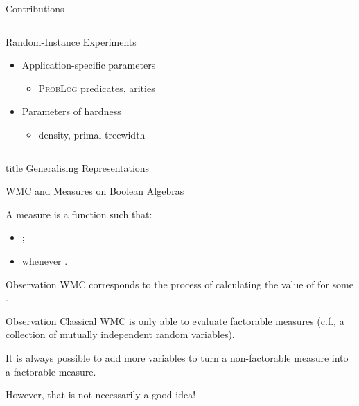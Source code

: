 \documentclass{beamer}
\begin{document}
\begin{frame}{Contributions}
\begin{columns}[t]
\begin{column}{0.54\textwidth}
      \begin{block}{Random-Instance Experiments}
        \begin{itemize}
          \item Application-specific parameters%
          \begin{itemize}
            \item \textsc{ProbLog} predicates, arities
          \end{itemize}
          \item Parameters of hardness
          \begin{itemize}
            \item density, primal treewidth
          \end{itemize}
        \end{itemize}
      \end{block}
    \end{column}
  \end{columns}
\end{frame}

\begin{frame}
  \vfill
  \centering
  \begin{beamercolorbox}[sep=8pt,center,shadow=true,rounded=true]{title}
    Generalising Representations\par%
  \end{beamercolorbox}
  \vfill
\end{frame}

\begin{frame}{WMC and Measures on Boolean Algebras}
  \begin{definition}
    A \alert{measure} is a function
    such that:
    \begin{itemize}
      \item {};
      \item {} whenever
            .
    \end{itemize}
  \end{definition}
  \begin{block}{Observation}
    WMC corresponds to the process of calculating the value of
     for some
    .
  \end{block}
  \pause
  \begin{block}{Observation}
    Classical WMC is only able to evaluate \alert{factorable} measures (c.f., a
    collection of mutually independent random variables).
  \end{block}
  \begin{theorem}
    It is always possible to add more variables to turn a non-factorable measure
    into a factorable measure.
  \end{theorem}
  However, that is not necessarily a good idea!
\end{frame}
\end{document}
